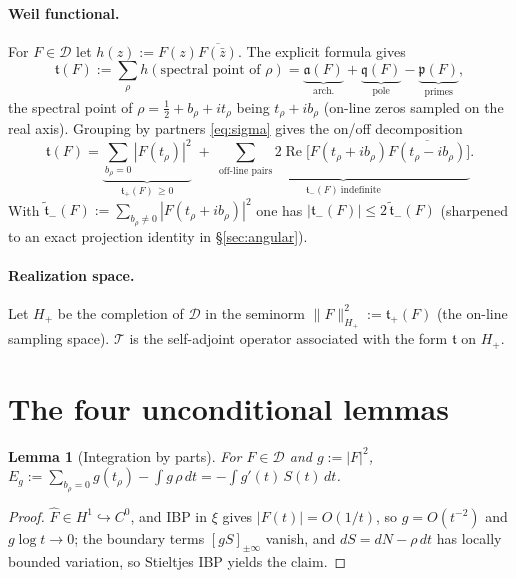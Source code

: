 \documentclass[11pt]{amsart}
\newtheorem{lemma}[theorem]{Lemma}
\theoremstyle{definition}
\theoremstyle{remark}
\newcommand{\re}{\operatorname{Re}}
\newcommand{\half}{\tfrac12}
\newcommand{\tform}{\mathfrak t}
\newcommand{\tplus}{\mathfrak t_+}
\newcommand{\tminus}{\mathfrak t_-}
\newcommand{\ttilde}{\widetilde{\mathfrak t}_-}
\newcommand{\Hplus}{H_+}
\newcommand{\rmar}{\mathfrak a}
\newcommand{\rmq}{\mathfrak q}
\newcommand{\rmp}{\mathfrak p}
\newcommand{\Top}{\mathcal T}
\newcommand{\Norm}[1]{\lVert #1 \rVert}
\begin{document}
\paragraph{Weil functional.} For $F\in\mathcal D$ let $h(z):=F(z)\overline{F(\bar z)}$.
The explicit formula gives
\begin{equation}\label{eq:EF}
\tform(F):=\sum_\rho h(\text{spectral point of }\rho)
=\underbrace{\rmar(F)}_{\text{arch.}}+\underbrace{\rmq(F)}_{\text{pole}}
-\underbrace{\rmp(F)}_{\text{primes}},
\end{equation}
the spectral point of $\rho=\half+b_\rho+it_\rho$ being $t_\rho+ib_\rho$ (on-line zeros
sampled on the real axis). Grouping by partners \eqref{eq:sigma} gives the on/off
decomposition
\begin{equation}\label{eq:onoff}
\tform(F)=\underbrace{\sum_{b_\rho=0}|F(t_\rho)|^{2}}_{\tplus(F)\,\ge0}
\;+\;\underbrace{\sum_{\text{off-line pairs}}2\re\!\big[F(t_\rho+ib_\rho)\overline{F(t_\rho-ib_\rho)}\big]}_{\tminus(F)\ \text{indefinite}} .
\end{equation}
With $\ttilde(F):=\sum_{b_\rho\ne0}|F(t_\rho+ib_\rho)|^{2}$ one has
$|\tminus(F)|\le 2\,\ttilde(F)$ (sharpened to an exact projection identity in
\S\ref{sec:angular}).

\paragraph{Realization space.} Let $\Hplus$ be the completion of $\mathcal D$ in the
seminorm $\Norm{F}_{\Hplus}^{2}:=\tplus(F)$ (the on-line sampling space). $\Top$ is the
self-adjoint operator associated with the form $\tform$ on $\Hplus$.

\section{The four unconditional lemmas}\label{sec:lemmas}

\begin{lemma}[Integration by parts]\label{lem:A}
For $F\in\mathcal D$ and $g:=|F|^{2}$,
$E_g:=\sum_{b_\rho=0} g(t_\rho)-\int g\,\rho\,dt=-\int g'(t)\,S(t)\,dt$.
\end{lemma}
\begin{proof}
$\widehat F\in H^{1}\hookrightarrow C^{0}$, and IBP in $\xi$ gives $|F(t)|=O(1/t)$, so
$g=O(t^{-2})$ and $g\log t\to0$; the boundary terms $[gS]_{\pm\infty}$ vanish, and
$dS=dN-\rho\,dt$ has locally bounded variation, so Stieltjes IBP yields the claim.
\end{proof}
\end{document}
